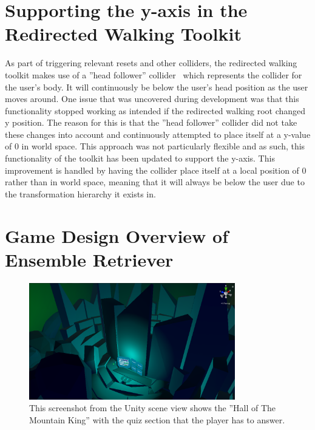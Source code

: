 \section{Supporting the y-axis in the Redirected Walking Toolkit}
As part of triggering relevant resets and other colliders, the redirected walking toolkit makes use of a ''head follower'' collider~\cite{headFollower} which represents the collider for the user's body. It will continuously be below the user's head position as the user moves around. One issue that was uncovered during development was that this functionality stopped working as intended if the redirected walking root changed y position. The reason for this is that the ''head follower'' collider did not take these changes into account and continuously attempted to place itself at a y-value of 0 in world space. This approach was not particularly flexible and as such, this functionality of the toolkit has been updated to support the y-axis. This improvement is handled by having the collider place itself at a local position of 0 rather than in world space, meaning that it will always be below the user due to the transformation hierarchy it exists in. 

\section{Game Design Overview of Ensemble Retriever} 
\begin{figure}[tbph]
    \centering
    \includegraphics[width=0.8\textwidth]{figures/screenshots/HallOfTheMountainKingKindaLowRes.png}
    \caption[Screenshot of the ''Hall of The Mountain King'']{This screenshot from the Unity scene view shows the ''Hall of The Mountain King'' with the quiz section that the player has to answer.}
    \label{fig:mkhallWithWall}
\end{figure}

